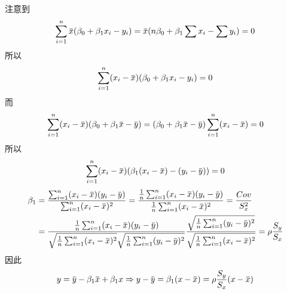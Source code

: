 \documentclass[11pt]{article}
\begin{document}
注意到
\begin{equation*}
\sum_{i=1}^n\barx(\beta_0+\beta_1x_i-y_i)=\barx(n\beta_0+\beta_1\sum x_i-\sum y_i)=0
\end{equation*}
所以
\begin{equation*}
\sum_{i=1}^n(x_i-\barx)(\beta_0+\beta_1x_i-y_i)=0
\end{equation*}
而
\begin{equation*}
\sum_{i=1}^n(x_i-\barx)(\beta_0+\beta_1\barx-\bary)=(\beta_0+\beta_1\barx-\bary)\sum_{i=1}^n(x_i-\barx)=0
\end{equation*}
所以
\begin{equation*}
\sum_{i=1}^n(x_i-\barx)(\beta_1(x_i-\barx)-(y_i-\bary))=0
\end{equation*}
\begin{align*}
\beta_1&=\frac{\sum_{i=1}^n(x_i-\barx)(y_i-\bary)}{\sum_{i=1}^n(x_i-\barx)^2}=
\frac{\frac{1}{n}\sum_{i=1}^n(x_i-\barx)(y_i-\bary)}{\frac{1}{n}
\sum_{i=1}^n(x_i-\barx)^2}=\frac{Cov}{S_x^2}\\
&=
\frac{\frac{1}{n}\sum_{i=1}^n(x_i-\barx)(y_i-\bary)}
{\sqrt{\frac{1}{n}\sum_{i=1}^n(x_i-\barx)^2}\sqrt{\frac{1}{n}\sum_{i=1}^n(y_i-\bary)^2}}
\frac{\sqrt{\frac{1}{n}\sum_{i=1}^n(y_i-\bary)^2}}{\sqrt{\frac{1}{n}\sum_{i=1}^n(x_i-\barx)^2}}=
\rho\frac{S_y}{S_x}
\end{align*}
因此
\begin{equation*}
y=\bary-\beta_1\barx+\beta_1x\Rightarrow y-\bary=\beta_1(x-\barx)=\rho\frac{S_y}{S_x}(x-\barx)
\end{equation*}
\end{document}
